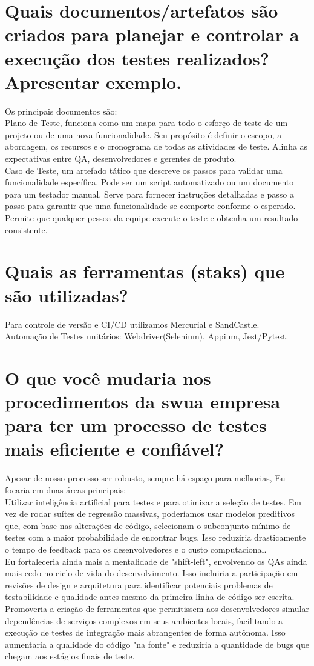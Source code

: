 \documentclass[ ]{article}
\begin{document}
\section{Quais documentos/artefatos são criados para planejar e controlar a execução dos testes realizados? Apresentar exemplo.}
Os principais documentos são:\\
Plano de Teste, funciona como um mapa para todo o esforço de teste de um projeto ou de uma nova funcionalidade. Seu propósito é definir o escopo, a abordagem, os recursos e o cronograma de todas as atividades de teste. Alinha as expectativas entre QA, desenvolvedores e gerentes de produto. \\
Caso de Teste, um artefado tático que descreve os passos para validar uma funcionalidade específica. Pode ser um script automatizado ou um documento para um testador manual. Serve para fornecer instruções detalhadas e passo a passo para garantir que uma funcionalidade se comporte conforme o esperado. Permite que qualquer pessoa da equipe execute o teste e obtenha um resultado consistente.

\section{Quais as ferramentas (staks) que são utilizadas?}
Para controle de versão e CI/CD utilizamos Mercurial e SandCastle.\\
Automação de Testes unitários: Webdriver(Selenium), Appium, Jest/Pytest.

\section{O que você mudaria nos procedimentos da swua empresa para ter um processo de testes mais eficiente e confiável?}
Apesar de nosso processo ser robusto, sempre há espaço para melhorias, Eu focaria em duas áreas principais:\\
Utilizar inteligência artificial para testes e para otimizar a seleção de testes. Em vez de rodar suítes de regressão massivas, poderíamos usar modelos preditivos que, com base nas alterações de código, selecionam o subconjunto mínimo de testes com a maior probabilidade de encontrar bugs. Isso reduziria drasticamente o tempo de feedback para os desenvolvedores e o custo computacional.\\
Eu fortaleceria ainda mais a mentalidade de "shift-left", envolvendo os QAs ainda mais cedo no ciclo de vida do desenvolvimento. Isso incluiria a participação em revisões de design e arquitetura para identificar potenciais problemas de testabilidade e qualidade antes mesmo da primeira linha de código ser escrita. Promoveria a criação de ferramentas que permitissem aos desenvolvedores simular dependências de serviços complexos em seus ambientes locais, facilitando a execução de testes de integração mais abrangentes de forma autônoma. Isso aumentaria a qualidade do código "na fonte" e reduziria a quantidade de bugs que chegam aos estágios finais de teste.
\end{document}
